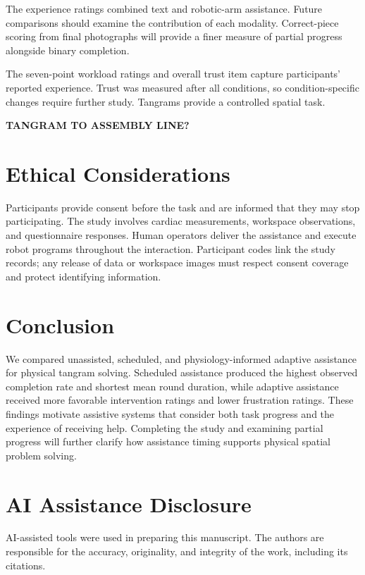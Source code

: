 \documentclass[sigconf]{aamas}
\begin{document}
The experience ratings combined text and robotic-arm assistance. Future comparisons should examine the contribution of each modality. Correct-piece scoring from final photographs will provide a finer measure of partial progress alongside binary completion.

The seven-point workload ratings and overall trust item capture participants' reported experience. Trust was measured after all conditions, so condition-specific changes require further study. Tangrams provide a controlled spatial task.

\textbf{TANGRAM TO ASSEMBLY LINE?}

\section{Ethical Considerations}

Participants provide consent before the task and are informed that they may stop participating. The study involves cardiac measurements, workspace observations, and questionnaire responses. Human operators deliver the assistance and execute robot programs throughout the interaction. Participant codes link the study records; any release of data or workspace images must respect consent coverage and protect identifying information.

\section{Conclusion}

We compared unassisted, scheduled, and physiology-informed adaptive assistance for physical tangram solving. Scheduled assistance produced the highest observed completion rate and shortest mean round duration, while adaptive assistance received more favorable intervention ratings and lower frustration ratings. These findings motivate assistive systems that consider both task progress and the experience of receiving help. Completing the study and examining partial progress will further clarify how assistance timing supports physical spatial problem solving.

\section*{AI Assistance Disclosure}

AI-assisted tools were used in preparing this manuscript. The authors are responsible for the accuracy, originality, and integrity of the work, including its citations.



\end{document}
